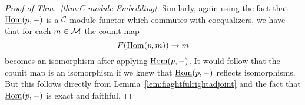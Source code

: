 \documentclass{amsart}
\begin{document}
\begin{proof}[Proof of Thm.~\ref{thm:C-module-Embedding}]
Similarly, again using the fact that $\operatorname{\underline{Hom}}(p,-)$ is a $\mathcal C$-module functor which commutes with coequalizers, we have that for each $m \in \mathcal M$ 
the counit map
\begin{equation*}
		F( \operatorname{\underline{Hom}}(p,m)) \to m
\end{equation*} 
becomes an isomorphism after applying $\operatorname{\underline{Hom}}(p,-)$. It would follow that the counit map is an isomorphism if we knew that $\operatorname{\underline{Hom}}(p,-)$ reflects isomorphisms. But this follows directly from Lemma~\ref{lem:fiaghtfulrightadjoint} and the fact that $\operatorname{\underline{Hom}}(p,-)$ is exact and faithful. 
\end{proof}
\end{document}
